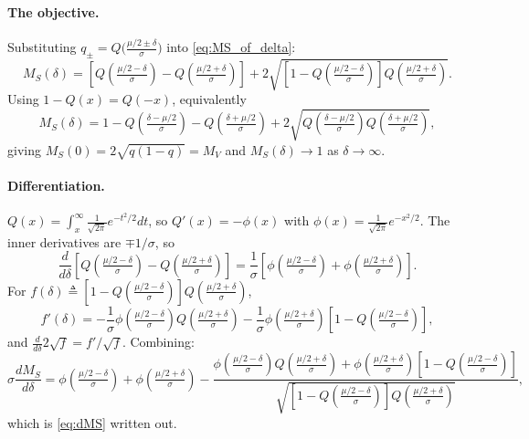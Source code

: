 \documentclass[11pt]{article}
\begin{document}
\paragraph{The objective.}
Substituting $q_\pm=Q\!\big(\tfrac{\mu/2\pm\delta}{\sigma}\big)$ into \eqref{eq:MS_of_delta}:
\begin{equation}
M_S(\delta)=
\left[Q\!\left(\tfrac{\mu/2-\delta}{\sigma}\right)-Q\!\left(\tfrac{\mu/2+\delta}{\sigma}\right)\right]
+2\sqrt{\left[1-Q\!\left(\tfrac{\mu/2-\delta}{\sigma}\right)\right]Q\!\left(\tfrac{\mu/2+\delta}{\sigma}\right)} .
\label{eq:MS_explicit}
\end{equation}
Using $1-Q(x)=Q(-x)$, equivalently
\begin{equation}
M_S(\delta)=1-Q\!\left(\tfrac{\delta-\mu/2}{\sigma}\right)-Q\!\left(\tfrac{\delta+\mu/2}{\sigma}\right)
+2\sqrt{Q\!\left(\tfrac{\delta-\mu/2}{\sigma}\right)Q\!\left(\tfrac{\delta+\mu/2}{\sigma}\right)} ,
\label{eq:MS_tails}
\end{equation}
giving $M_S(0)=2\sqrt{q(1-q)}=M_V$ and $M_S(\delta)\to1$ as $\delta\to\infty$.

\paragraph{Differentiation.}
$Q(x)=\int_x^\infty\frac{1}{\sqrt{2\pi}}e^{-t^2/2}dt$, so $Q'(x)=-\phi(x)$ with
$\phi(x)=\frac{1}{\sqrt{2\pi}}e^{-x^2/2}$. The inner derivatives are $\mp1/\sigma$, so
\begin{equation}
\frac{d}{d\delta}\left[Q\!\left(\tfrac{\mu/2-\delta}{\sigma}\right)-Q\!\left(\tfrac{\mu/2+\delta}{\sigma}\right)\right]
=\frac{1}{\sigma}\left[\phi\!\left(\tfrac{\mu/2-\delta}{\sigma}\right)+\phi\!\left(\tfrac{\mu/2+\delta}{\sigma}\right)\right].
\end{equation}
For $f(\delta)\triangleq\left[1-Q\!\left(\tfrac{\mu/2-\delta}{\sigma}\right)\right]Q\!\left(\tfrac{\mu/2+\delta}{\sigma}\right)$,
\begin{equation}
f'(\delta)=-\frac{1}{\sigma}\phi\!\left(\tfrac{\mu/2-\delta}{\sigma}\right)Q\!\left(\tfrac{\mu/2+\delta}{\sigma}\right)
-\frac{1}{\sigma}\phi\!\left(\tfrac{\mu/2+\delta}{\sigma}\right)\left[1-Q\!\left(\tfrac{\mu/2-\delta}{\sigma}\right)\right],
\end{equation}
and $\frac{d}{d\delta}2\sqrt{f}=f'/\sqrt{f}$. Combining:
\begin{equation}
\sigma\frac{dM_S}{d\delta}=
\phi\!\left(\tfrac{\mu/2-\delta}{\sigma}\right)+\phi\!\left(\tfrac{\mu/2+\delta}{\sigma}\right)
-\frac{\phi\!\left(\tfrac{\mu/2-\delta}{\sigma}\right)Q\!\left(\tfrac{\mu/2+\delta}{\sigma}\right)
+\phi\!\left(\tfrac{\mu/2+\delta}{\sigma}\right)\left[1-Q\!\left(\tfrac{\mu/2-\delta}{\sigma}\right)\right]}
{\sqrt{\left[1-Q\!\left(\tfrac{\mu/2-\delta}{\sigma}\right)\right]Q\!\left(\tfrac{\mu/2+\delta}{\sigma}\right)}} ,
\label{eq:app_full}
\end{equation}
which is \eqref{eq:dMS} written out.
\end{document}
